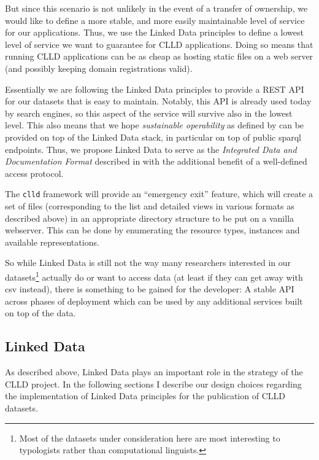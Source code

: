 \documentclass[a4paper,10pt]{article}
\begin{document}
But since this scenario is not unlikely in the event of a transfer of ownership, we would
like to define a more stable, and more easily maintainable level of service for our
applications. Thus, we use the Linked Data principles to define a lowest level of service we
want to guarantee for CLLD applications. Doing so means that running CLLD applications can
be as cheap as hosting static files on a web server (and possibly keeping domain
registrations valid).

Essentially we are following the Linked Data principles to provide a REST API for our
datasets that is easy to maintain. Notably, this API is already used today by search engines,
so this aspect of the service will survive also in the lowest level. This also means that
we hope \emph{sustainable operability} as defined by  can be
provided on top of the Linked Data stack, in particular on top of public sparql endpoints.
Thus, we propose Linked Data to serve as the \emph{Integrated Data and Documentation Format}
described in  with the additional benefit of a well-defined access protocol.

The \texttt{clld} framework will provide an ``emergency exit'' feature, which will create
a set of files (corresponding to the list and detailed views in various formats as described
above) in an appropriate directory structure to be put on a vanilla webserver.
This can be done by enumerating the resource types, instances and available representations.


So while Linked Data is still not the way many researchers interested in our datasets\footnote{Most of
the datasets under consideration here are most interesting to typologists rather than computational
linguists.}
actually do or want to access data (at least if they can get away with csv instead), there is
something to be gained for the
developer: A stable API across phases of deployment which can be used by any additional services
built on top of the data.


\subsection{Linked Data}

As described above, Linked Data plays an important role in the strategy of the CLLD project.
In the following sections I describe our design choices regarding the implementation of Linked
Data principles for the publication of CLLD datasets.
\end{document}
